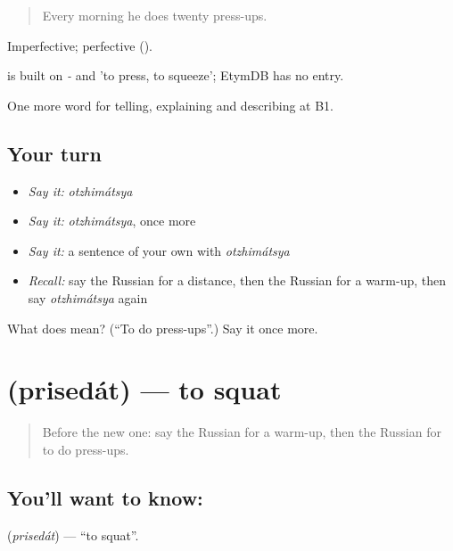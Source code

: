 \begin{quote}
Every morning he does twenty press-ups.
\end{quote}

Imperfective; perfective  ().

\begin{cousinweb}
\emph{} is built on \emph{-} and \emph{} 'to press, to squeeze'; EtymDB has no entry.
\end{cousinweb}

\begin{grammarlens}[title={What you've built}]
One more word for telling, explaining and describing at B1.
\end{grammarlens}

\subsection*{Your turn}
\begin{itemize}
\raggedright
  \item \emph{Say it:} \emph{otzhimátsya}
  \item \emph{Say it:} \emph{otzhimátsya}, once more
  \item \emph{Say it:} a sentence of your own with \emph{otzhimátsya}
  \item \emph{Recall:} say the Russian for a distance, then the Russian for a warm-up, then say \emph{otzhimátsya} again
\end{itemize}

\begin{tcolorbox}[breakable,colback=teal!4,colframe=teal!35!black,title={Before you move on}]
What does  mean? (\textquotedblleft{}To do press-ups\textquotedblright{}.) Say it once more.
\end{tcolorbox}
\section[\texorpdfstring{\ru{приседать} (prisedát)}{приседать (prisedát)}]{ (prisedát) — to squat}

\label{lesson:RU-C513-prisedat}



\begin{quote}
Before the new one: say the Russian for a warm-up, then the Russian for to do press-ups.
\end{quote}

\subsection*{You'll want to know: }
\textbf{} (\emph{prisedát}) — \textquotedblleft{}to squat\textquotedblright{}.

